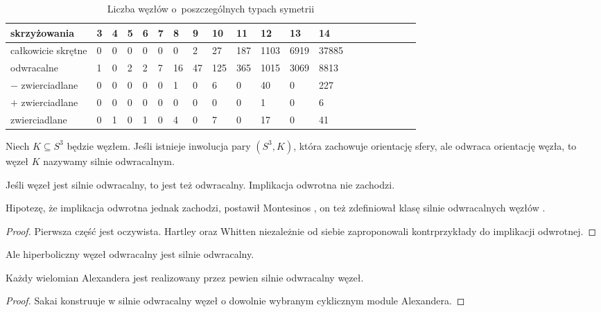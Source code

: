 \begin{table}[h]
    \centering
    \begin{tabular}{@{}*{20}l@{}} \toprule
        skrzyżowania & 3 & 4 & 5 & 6 & 7 & 8 & 9 & 10 & 11 & 12 & 13 & 14 \\ \midrule
        całkowicie skrętne & 0 & 0 & 0 & 0 & 0 & 0 & 2 & 27 & 187 & 1103 & 6919 & 37885 \\
        odwracalne & 1 & 0 & 2 & 2 & 7 & 16 & 47 & 125 & 365 & 1015 & 3069 & 8813 \\
        $-$ zwierciadlane & 0 & 0 & 0 & 0 & 0 & 1 & 0 & 6 & 0 & 40 & 0 & 227 \\
        $+$ zwierciadlane & 0 & 0 & 0 & 0 & 0 & 0 & 0 & 0 & 0 & 1 & 0 & 6 \\
        zwierciadlane & 0 & 1 & 0 & 1 & 0 & 4 & 0 & 7 & 0 & 17 & 0 & 41 \\
        \bottomrule
        \hline
    \end{tabular}
    \caption{Liczba węzłów o~poszczególnych typach symetrii}
\end{table}

\begin{definition}
    Niech $K \subseteq S^3$ będzie węzłem.
    Jeśli istnieje inwolucja pary $(S^3, K)$, która zachowuje orientację sfery, ale odwraca orientację węzła, to węzeł $K$ nazywamy silnie odwracalnym.
\end{definition}

\begin{proposition}
    Jeśli węzeł jest silnie odwracalny, to jest też odwracalny.
    Implikacja odwrotna nie zachodzi.
\end{proposition}

Hipotezę, że implikacja odwrotna jednak zachodzi, postawił Montesinos \cite[problem 1.6]{kirby78}, on też zdefiniował klasę silnie odwracalnych węzłów \cite{montesinos75}.

\begin{proof}
    Pierwsza część jest oczywista.
    Hartley \cite{hartley80} oraz Whitten \cite{whitten81} niezależnie od siebie zaproponowali kontrprzykłady do implikacji odwrotnej.
\end{proof}

Ale hiperboliczny węzeł odwracalny jest silnie odwracalny.

\begin{proposition}
    Każdy wielomian Alexandera jest realizowany przez pewien silnie odwracalny węzeł.
\end{proposition}

\begin{proof}
    Sakai konstruuje w \cite{sakai83} silnie odwracalny węzeł o dowolnie wybranym cyklicznym module Alexandera.
\end{proof}


